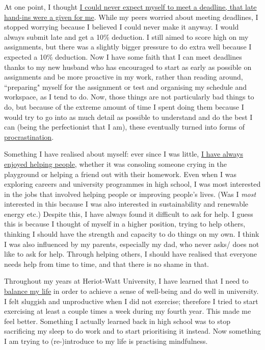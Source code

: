 At one point, I thought \underline{I could never expect myself to meet a deadline, that late hand-ins were a given for me}.
While my peers worried about meeting deadlines, I stopped worrying because I believed I could never make it anyway.
I would always submit late and get a 10\% deduction.
I still aimed to score high on my assignments, but there was a slightly bigger pressure to do extra well because I expected a 10\% deduction.
Now I have some faith that I can meet deadlines thanks to my new husband who has encouraged to start as early as possible on assignments and be more proactive in my work, rather than reading around, ``preparing" myself for the assignment or test and organising my schedule and workspace, as I tend to do.
Now, those things are not particularly bad things to do, but because of the extreme amount of time I spent doing them because I would try to go into as much detail as possible to understand and do the best I can (being the perfectionist that I am), these eventually turned into forms of \underline{procrastination}.

Something I have realised about myself:
ever since I was little, \underline{I have always enjoyed helping people}, whether it was consoling someone crying in the playground or helping a friend out with their homework.
Even when I was exploring careers and university programmes in high school, I was most interested in the jobs that involved helping people or improving people's lives.
(Was I \textit{most} interested in this because I was also interested in sustainability and renewable energy etc.)
Despite this, I have always found it difficult to ask for help.
I guess this is because I thought of myself in a higher position, trying to help others, thinking I should have the strength and capacity to do things on my own.
I think I was also influenced by my parents, especially my dad, who never asks/ does not like to ask for help.
Through helping others, I should have realised that everyone needs help from time to time, and that there is no shame in that.

Throughout my years at Heriot-Watt University, I have learned that I need to \underline{balance my life} in order to achieve a sense of well-being and do well in university.
I felt sluggish and unproductive when I did not exercise; therefore I tried to start exercising at least a couple times a week during my fourth year.
This made me feel better.
Something I actually learned back in high school was to stop sacrificing my sleep to do work and to start prioritising it instead.
Now something I am trying to (re-)introduce to my life is practising mindfulness.

